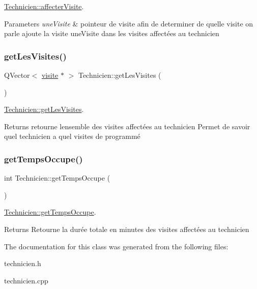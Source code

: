 \hyperlink{class_technicien_ae214082b07ffa459ebfb99e9efd4da20}{Technicien\+::affecter\+Visite}. 


\begin{DoxyParams}{Parameters}
{\em une\+Visite} & pointeur de visite afin de determiner de quelle visite on parle ajoute la visite une\+Visite dans les visites affectées au technicien \\
\hline
\end{DoxyParams}
\mbox{\label{class_technicien_a8ad18bf2c5758dbb6261594c544e47f9}} 
\subsubsection{\texorpdfstring{get\+Les\+Visites()}{getLesVisites()}}
{\footnotesize\ttfamily Q\+Vector$<$ \hyperlink{classvisite}{visite} $\ast$ $>$ Technicien\+::get\+Les\+Visites (\begin{DoxyParamCaption}{ }\end{DoxyParamCaption})}



\hyperlink{class_technicien_a8ad18bf2c5758dbb6261594c544e47f9}{Technicien\+::get\+Les\+Visites}. 

\begin{DoxyReturn}{Returns}
retourne l\textquotesingle{}ensemble des visites affectées au technicien Permet de savoir quel technicien a quel visites de programmé 
\end{DoxyReturn}
\mbox{\label{class_technicien_af111a0a23ae6ce1dbcb552817266744e}} 
\subsubsection{\texorpdfstring{get\+Temps\+Occupe()}{getTempsOccupe()}}
{\footnotesize\ttfamily int Technicien\+::get\+Temps\+Occupe (\begin{DoxyParamCaption}{ }\end{DoxyParamCaption})}



\hyperlink{class_technicien_af111a0a23ae6ce1dbcb552817266744e}{Technicien\+::get\+Temps\+Occupe}. 

\begin{DoxyReturn}{Returns}
Retourne la durée totale en minutes des visites affectées au technicien 
\end{DoxyReturn}


The documentation for this class was generated from the following files\+:\begin{DoxyCompactItemize}
\item 
technicien.\+h\item 
technicien.\+cpp\end{DoxyCompactItemize}
